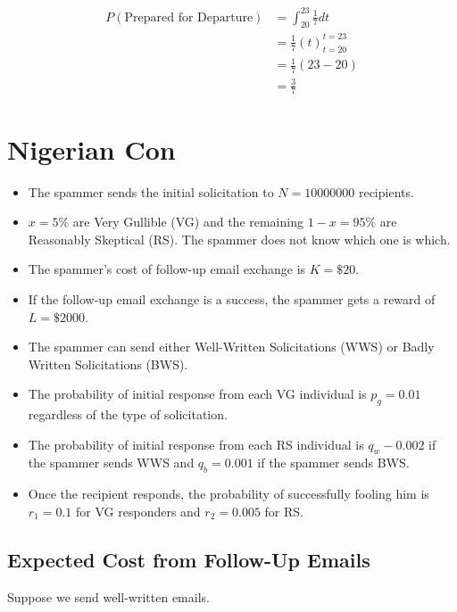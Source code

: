 \documentclass{article}
\begin{document}
\begin{align}
P\left( \text{Prepared for Departure} \right)
	& = \int_{20}^{23} \frac{1}{7} dt \nonumber \\
	& = \frac17 \left( t \right)^{t = 23}_{t = 20} \nonumber \\
	& = \frac17 \left(23 - 20\right) \nonumber \\
	& = \frac37
\end{align}

\section{Nigerian Con}

\begin{itemize}
\item The spammer sends the initial solicitation to $N = 10000000$ recipients.
\item $x = 5\%$ are Very Gullible (VG) and the remaining $1-x = 95\%$ are Reasonably
	Skeptical (RS).
The spammer does not know which one is which.
\item The spammer's cost of follow-up email exchange is $K = \$20$.
\item If the follow-up email exchange is a success, the spammer gets 
	a reward of $L = \$2000$.
\item The spammer can send either Well-Written Solicitations (WWS)
	or Badly Written Solicitations (BWS).
\item The probability of initial response from each VG individual is $p_g = 0.01$
	regardless of the type of solicitation.
\item The probability of initial response from each RS individual is $q_w - 0.002$
	if the spammer sends WWS and $q_b = 0.001$ if the spammer sends BWS.
\item Once the recipient responds, the probability of successfully fooling
	him is $r_1 = 0.1$ for VG responders and $r_2 = 0.005$ for RS.
\end{itemize}

\subsection{Expected Cost from Follow-Up Emails}

Suppose we send well-written emails.
\end{document}
